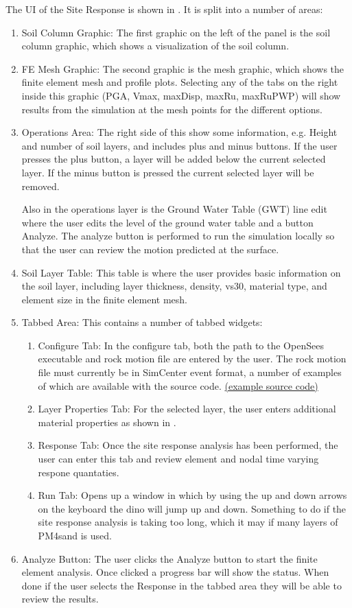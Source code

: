 The UI of the Site Response is shown in . It is split into a number of areas:
\begin{enumerate}
\item Soil Column Graphic: The first graphic on the left of the panel is 
the soil column graphic, which shows a visualization of the soil column.
\item FE Mesh Graphic: The second graphic is the mesh graphic, which shows 
the finite element mesh and profile plots. Selecting any of the tabs on the right inside this graphic (PGA, Vmax, maxDisp, maxRu, maxRuPWP) will show results
from the simulation at the mesh points for the different options.
\item Operations Area: The right side of this show some information, e.g. Height and number of soil layers, and includes plus and minus buttons. If the user presses the plus button, a layer will be added below the current selected layer. If the minus button is pressed the current selected layer will be removed.

Also in the operations layer is the Ground Water Table (GWT) line edit where the user edits the level of the ground water table and a button Analyze. The analyze button is performed to run the simulation locally so that the user can review the motion predicted at the surface.
\item Soil Layer Table: This table is where the user provides basic information on the soil layer, including layer thickness, density, vs30, material type, and element size in the finite element mesh.
\item Tabbed Area: This contains a number of tabbed widgets: \begin{enumerate}
\item Configure Tab: In the configure tab, both the path to the OpenSees executable and rock motion file are entered by the user. The rock motion file must currently be in SimCenter event format, a number of examples of which are available with the source code. \href{https://github.com/NHERI-SimCenter/EE-UQ/tree/master/example1/event}{(example source code)} 
\item Layer Properties Tab: For the selected layer, the user enters additional material properties as shown in .
\item Response Tab: Once the site response analysis has been performed, the user can enter this tab and review element and nodal time varying respone quantaties.
\item Run Tab: Opens up a window in which by using the up and down arrows on the keyboard the dino will jump up and down. Something to do if the site response analysis is taking too long, which it may if many layers of PM4sand is used.
\end{enumerate}
\item Analyze Button:
The user clicks the Analyze button to start the finite element analysis. Once clicked a progress bar will show the status. When done if the user selects the Response in the tabbed area they will be able to review the results.
\end{enumerate}

